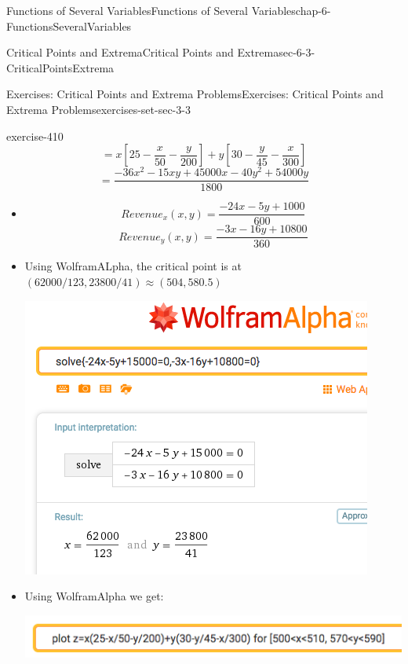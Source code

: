 \documentclass[oneside,10pt,]{book}
\numberwithin{equation}{section}
\begin{document}
\begin{chapterptx}{Functions of Several Variables}{}{Functions of Several Variables}{}{}{chap-6-FunctionsSeveralVariables}
\begin{sectionptx}{Critical Points and Extrema}{}{Critical Points and Extrema}{}{}{sec-6-3-CriticalPointsExtrema}
\begin{exercises-subsection-numberless}{Exercises: Critical Points and Extrema Problems}{}{Exercises: Critical Points and Extrema Problems}{}{}{exercises-set-sec-3-3}
\begin{divisionexercise}{5}{}{}{exercise-410}
%
\begin{equation*}
=x \left[25-\frac{x}{50}-\frac{y}{200}\right]
+y\left[30-\frac{y}{45}-\frac{x}{300}\right]
\end{equation*}
%
\begin{equation*}
= \frac{-36x^2-15xy+45000x-40y^2+54000y}{1800} 
\end{equation*}
\leavevmode%
\begin{itemize}[label=\textbullet]
\item{}%
\begin{equation*}
Revenue_x (x,y)
= \frac{-24x-5y+1000}{600} 
\end{equation*}
%
\begin{equation*}
Revenue_y (x,y)
= \frac{-3x-16y+10800}{360} 
\end{equation*}
%
\item{}\hypertarget{p-2414}{}%
Using WolframALpha, the critical point is at \((62000/123, 23800/41)  \approx (504, 580.5)\)%
\begin{sidebyside}{1}{0.25}{0.25}{0}%
\begin{sbspanel}{0.5}%
\includegraphics[width=1\linewidth]{images/sec6-3-sol5a.png}
\end{sbspanel}%
\end{sidebyside}%
\item{}\hypertarget{p-2415}{}%
Using WolframAlpha we get:%
\begin{sidebyside}{1}{0.2}{0.2}{0}%
\begin{sbspanel}{0.6}%
\includegraphics[width=1\linewidth]{images/sec6-3-sol5b.png}

\end{sbspanel}
\end{sidebyside}
\end{itemize}
\end{divisionexercise}
\end{exercises-subsection-numberless}
\end{sectionptx}
\end{chapterptx}
\end{document}

